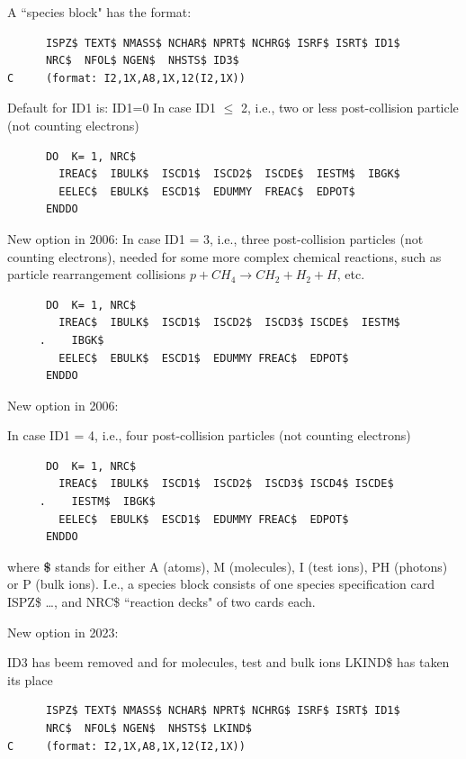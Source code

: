 A ``species block" has the format:

\begin{lstlisting}
      ISPZ$ TEXT$ NMASS$ NCHAR$ NPRT$ NCHRG$ ISRF$ ISRT$ ID1$
      NRC$  NFOL$ NGEN$  NHSTS$ ID3$
C     (format: I2,1X,A8,1X,12(I2,1X))
\end{lstlisting}

Default for ID1 is:  ID1=0 In case ID1 $\leq$ 2, i.e., two or less
post-collision particle (not counting electrons) 

\begin{lstlisting}
      DO  K= 1, NRC$
        IREAC$  IBULK$  ISCD1$  ISCD2$  ISCDE$  IESTM$  IBGK$
        EELEC$  EBULK$  ESCD1$  EDUMMY  FREAC$  EDPOT$
      ENDDO
\end{lstlisting} 

New option in 2006:
In case ID1 = 3, i.e., three post-collision particles (not counting electrons),
needed for some more complex chemical reactions, such as particle rearrangement
collisions $p + CH_4 \rightarrow CH_2 + H_2 + H$, etc. 

\begin{lstlisting}
      DO  K= 1, NRC$
        IREAC$  IBULK$  ISCD1$  ISCD2$  ISCD3$ ISCDE$  IESTM$
     .    IBGK$
        EELEC$  EBULK$  ESCD1$  EDUMMY FREAC$  EDPOT$
      ENDDO
\end{lstlisting} 

New option in 2006:

In case ID1 = 4, i.e., four post-collision particles (not counting electrons)

\begin{lstlisting}
      DO  K= 1, NRC$
        IREAC$  IBULK$  ISCD1$  ISCD2$  ISCD3$ ISCD4$ ISCDE$
     .    IESTM$  IBGK$
        EELEC$  EBULK$  ESCD1$  EDUMMY FREAC$  EDPOT$
      ENDDO
\end{lstlisting} 

where \textbf{\$} stands for either A (atoms), M (molecules), I (test ions), PH
(photons) or P (bulk ions).
I.e., a species block consists of one species specification card ISPZ\$ \dots,
and NRC\$ ``reaction decks" of two cards each.

New option in 2023:

ID3 has beem removed and for molecules, test and bulk ions LKIND\$ has taken 
its place

\begin{lstlisting}
      ISPZ$ TEXT$ NMASS$ NCHAR$ NPRT$ NCHRG$ ISRF$ ISRT$ ID1$
      NRC$  NFOL$ NGEN$  NHSTS$ LKIND$
C     (format: I2,1X,A8,1X,12(I2,1X))
\end{lstlisting}



